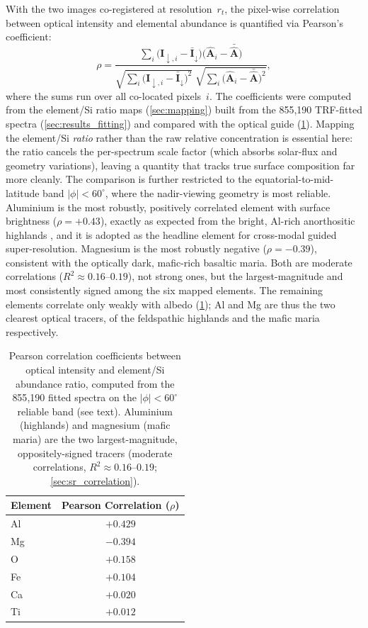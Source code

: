 \documentclass[journal,lettersize]{IEEEtran}
\begin{document}
With the two images co-registered at resolution~$r_t$, the pixel-wise
correlation between optical intensity and elemental abundance is
quantified via Pearson's coefficient:
\begin{equation}\label{eq:pearson}
  \rho = \frac{
    \sum_{i}\bigl(\mathbf{I}_{\downarrow,i} - \bar{\mathbf{I}}_\downarrow\bigr)
    \bigl(\hat{\mathbf{A}}_i - \bar{\hat{\mathbf{A}}}\bigr)
  }{
    \sqrt{\sum_{i}\bigl(\mathbf{I}_{\downarrow,i}
      - \bar{\mathbf{I}}_\downarrow\bigr)^2}\;
    \sqrt{\sum_{i}\bigl(\hat{\mathbf{A}}_i
      - \bar{\hat{\mathbf{A}}}\bigr)^2}
  },
\end{equation}
where the sums run over all co-located pixels~$i$.  The coefficients
were computed from the element/Si ratio maps (\cref{sec:mapping}) built
from the 855{,}190 TRF-fitted spectra (\cref{sec:results_fitting}) and
compared with the optical guide (\cref{tab:correlation}). Mapping the
element/Si \emph{ratio} rather than the raw relative concentration is
essential here: the ratio cancels the per-spectrum scale factor (which
absorbs solar-flux and geometry variations), leaving a quantity that
tracks true surface composition far more cleanly. The comparison is
further restricted to the equatorial-to-mid-latitude band
$|\phi| < 60^{\circ}$, where the nadir-viewing geometry is most reliable.
Aluminium is the most robustly, positively correlated element with
surface brightness ($\rho = +0.43$), exactly as expected from the
bright, Al-rich anorthositic highlands \cite{Lucey2000}, and it is
adopted as the headline element for cross-modal guided super-resolution.
Magnesium is the most robustly negative ($\rho = -0.39$), consistent
with the optically dark, mafic-rich basaltic maria. Both are moderate
correlations ($R^2\approx0.16$--$0.19$), not strong ones, but the
largest-magnitude and most consistently signed among the six mapped
elements. The remaining elements correlate only weakly with albedo
(\cref{tab:correlation}); Al and Mg are thus the two clearest optical
tracers, of the feldspathic highlands and the mafic maria respectively.

\begin{table}[!t]
  \centering
  \caption{Pearson correlation coefficients between optical intensity
    and element/Si abundance ratio, computed from the 855{,}190 fitted
    spectra on the $|\phi|<60^{\circ}$ reliable band (see text). Aluminium
    (highlands) and magnesium (mafic maria) are the two largest-magnitude,
    oppositely-signed tracers (moderate correlations, $R^2\approx0.16$--$0.19$;
    \cref{sec:sr_correlation}).}
  \label{tab:correlation}
  \begin{tabular}{lc}
    \toprule
    \textbf{Element} & \textbf{Pearson Correlation ($\rho$)} \\
    \midrule
    Al   &  $+0.429$ \\
    Mg   &  $-0.394$ \\
    O    &  $+0.158$ \\
    Fe   &  $+0.104$ \\
    Ca   &  $+0.020$ \\
    Ti   &  $+0.012$ \\
    \bottomrule
  \end{tabular}
\end{table}
\end{document}
